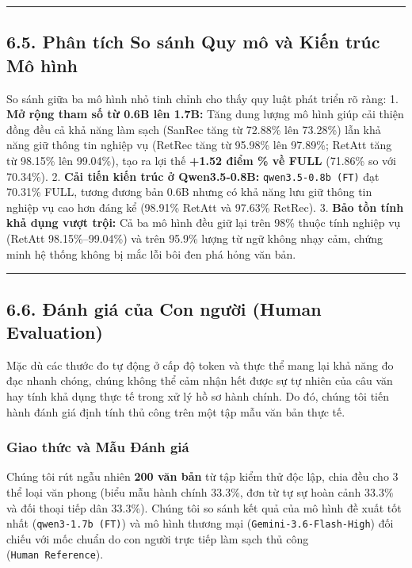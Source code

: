 \documentclass[
  11pt,
  a4paper,
]{article}
\begin{document}
\begin{center}\rule{0.5\linewidth}{0.5pt}\end{center}

\subsection{6.5. Phân tích So sánh Quy mô và Kiến trúc Mô
hình}\label{phuxe2n-tuxedch-so-suxe1nh-quy-muxf4-vuxe0-kiux1ebfn-truxfac-muxf4-huxecnh}

So sánh giữa ba mô hình nhỏ tinh chỉnh cho thấy quy luật phát triển rõ ràng: 1. \textbf{Mở rộng tham
số từ 0.6B lên 1.7B:} Tăng dung lượng mô hình giúp cải thiện đồng đều cả khả năng làm sạch (SanRec
tăng từ 72.88\% lên 73.28\%) lẫn khả năng giữ thông tin nghiệp vụ (RetRec tăng từ 95.98\% lên
97.89\%; RetAtt tăng từ 98.15\% lên 99.04\%), tạo ra lợi thế \textbf{+1.52 điểm \% về FULL} (71.86\%
so với 70.34\%). 2. \textbf{Cải tiến kiến trúc ở Qwen3.5-0.8B:} \texttt{qwen3.5-0.8b\ (FT)} đạt
70.31\% FULL, tương đương bản 0.6B nhưng có khả năng lưu giữ thông tin nghiệp vụ cao hơn đáng kể
(98.91\% RetAtt và 97.63\% RetRec). 3. \textbf{Bảo tồn tính khả dụng vượt trội:} Cả ba mô hình đều
giữ lại trên 98\% thuộc tính nghiệp vụ (RetAtt 98.15\%--99.04\%) và trên 95.9\% lượng từ ngữ không
nhạy cảm, chứng minh hệ thống không bị mắc lỗi bôi đen phá hỏng văn bản.

\begin{center}\rule{0.5\linewidth}{0.5pt}\end{center}

\subsection{6.6. Đánh giá của Con người (Human
Evaluation)}\label{ux111uxe1nh-giuxe1-cux1ee7a-con-ngux1b0ux1eddi-human-evaluation}

Mặc dù các thước đo tự động ở cấp độ token và thực thể mang lại khả năng đo đạc nhanh chóng, chúng
không thể cảm nhận hết được sự tự nhiên của câu văn hay tính khả dụng thực tế trong xử lý hồ sơ hành
chính. Do đó, chúng tôi tiến hành đánh giá định tính thủ công trên một tập mẫu văn bản thực tế.

\subsubsection{Giao thức và Mẫu Đánh giá}\label{giao-thux1ee9c-vuxe0-mux1eabu-ux111uxe1nh-giuxe1}

Chúng tôi rút ngẫu nhiên \textbf{200 văn bản} từ tập kiểm thử độc lập, chia đều cho 3 thể loại văn
phong (biểu mẫu hành chính 33.3\%, đơn từ tự sự hoàn cảnh 33.3\% và đối thoại tiếp dân 33.3\%).
Chúng tôi so sánh kết quả của mô hình đề xuất tốt nhất (\texttt{qwen3-1.7b\ (FT)}) và mô hình thương
mại (\texttt{Gemini-3.6-Flash-High}) đối chiếu với mốc chuẩn do con người trực tiếp làm sạch thủ
công (\texttt{Human\ Reference}).
\end{document}

